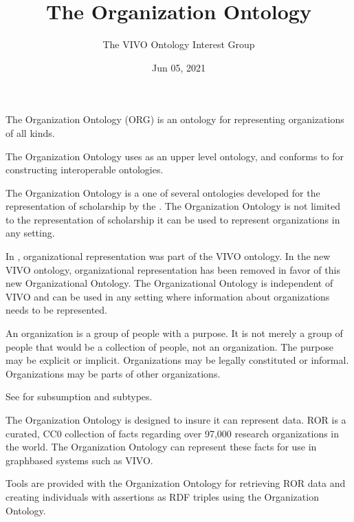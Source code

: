 \documentclass[letterpaper,10pt,english]{sphinxmanual}
\title{The Organization Ontology}
\date{Jun 05, 2021}
\author{The VIVO Ontology Interest Group}
\begin{document}
\pagestyle{empty}
\sphinxmaketitle
\pagestyle{plain}
\sphinxtableofcontents
\pagestyle{normal}
\label{\detokenize{index::doc}}


\sphinxAtStartPar
The Organization Ontology (ORG) is an ontology for
representing organizations of all kinds.

\sphinxAtStartPar
The Organization Ontology uses  as an upper level ontology, and conforms to
 for constructing interoperable ontologies.

\sphinxAtStartPar
The Organization
Ontology is a one of several ontologies developed for the representation of
scholarship by the . The Organization Ontology is
not limited to the representation of
scholarship \textendash{} it can be used to represent organizations in any setting.

\sphinxAtStartPar
In {\hyperref[\detokenize{glossary:glossary}]{}}, organizational representation was part of the VIVO
ontology.  In the new VIVO ontology, organizational
representation has been removed in favor of this new Organizational Ontology.  The
Organizational Ontology
is independent of VIVO and
can be used in any setting where information about organizations needs to be
represented.

\sphinxAtStartPar
An organization is a group of people with a purpose. It is not merely a group of
people \textendash{} that would be a collection of people, not an organization. The purpose
may be explicit or implicit. Organizations may be legally constituted or informal.
Organizations may be parts of other organizations.

\sphinxAtStartPar
See {\hyperref[\detokenize{organizations:organizations}]{}} for subsumption and subtypes.

\sphinxAtStartPar
The Organization Ontology is designed to insure it can represent
 data. ROR is a curated, CC0
collection of facts regarding over 97,000 research organizations in the world. The
Organization Ontology can represent these facts for use in graph\sphinxhyphen{}based systems such
as VIVO.

\sphinxAtStartPar
Tools are provided with the Organization Ontology for retrieving ROR data and
creating individuals with assertions as RDF triples using the Organization Ontology.
\end{document}
